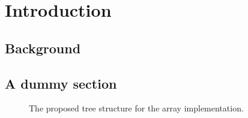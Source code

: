 %
%
\chapter{Introduction}

\section{Background}

\section{A dummy section}

\begin{figure}[!h]
	\centering
	\caption{The proposed tree structure for the array implementation.}
\end{figure}


\clearpage